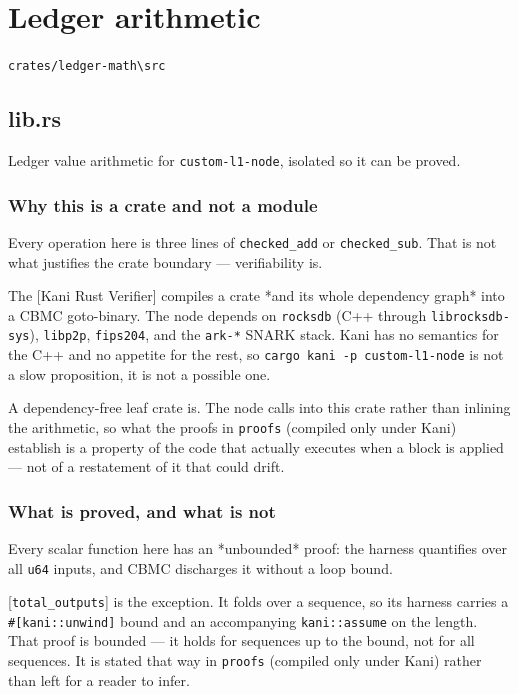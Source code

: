 \documentclass[11pt,a4paper]{article}
\begin{document}
\section{Ledger arithmetic}
\noindent\texttt{crates/ledger-math\textbackslash{}src}

\subsection{lib.rs}
Ledger value arithmetic for \texttt{custom-l1-node}, isolated so it can be proved.

\subsubsection{Why this is a crate and not a module}

Every operation here is three lines of \texttt{checked\_add} or \texttt{checked\_sub}. That
is not what justifies the crate boundary — verifiability is.

The [Kani Rust Verifier] compiles a crate *and its whole dependency graph*
into a CBMC goto-binary. The node depends on \texttt{rocksdb} (C++ through
\texttt{librocksdb-sys}), \texttt{libp2p}, \texttt{fips204}, and the \texttt{ark-*} SNARK stack. Kani
has no semantics for the C++ and no appetite for the rest, so
\texttt{cargo kani -p custom-l1-node} is not a slow proposition, it is not a
possible one.

A dependency-free leaf crate is. The node calls into this crate rather than
inlining the arithmetic, so what the proofs in \texttt{proofs} (compiled only under
Kani) establish is a property of the code that actually executes when a
block is applied — not of a restatement of it that could drift.

\subsubsection{What is proved, and what is not}

Every scalar function here has an *unbounded* proof: the harness quantifies
over all \texttt{u64} inputs, and CBMC discharges it without a loop bound.

[\texttt{total\_outputs}] is the exception. It folds over a sequence, so its harness
carries a \texttt{\#[kani::unwind]} bound and an accompanying \texttt{kani::assume} on the
length. That proof is bounded — it holds for sequences up to the bound, not
for all sequences. It is stated that way in \texttt{proofs} (compiled only under
Kani) rather than left for a reader to infer.
\end{document}
